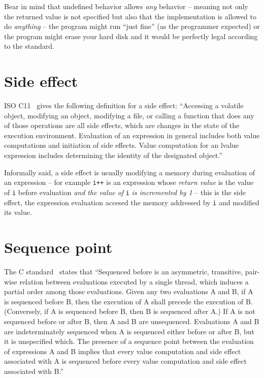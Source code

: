 Bear in mind that undefined behavior allows \emph{any} behavior -- meaning not only the returned value is not specified but also that the implementation is allowed to do \emph{anything} -- the program might run ``just fine'' (as the programmer expected) or the program might erase your hard disk and it would be perfectly legal according to the standard.

\section{Side effect}
ISO C11~\cite{WG14N1570} gives the following definition for a side effect: ``Accessing a volatile object, modifying an object, modifying a file, or calling a function that does any of those operations are all side effects, which are changes in the state of the execution environment. Evaluation of an expression in general includes both value computations and initiation of side effects. Value computation for an lvalue expression includes determining the identity of the designated object.''

Informally said, a side effect is usually modifying a memory during evaluation of an expression -- for example \verb|i++| is an expression whose \emph{return value} is the value of \verb|i| before evaluation \emph{and the value of }\verb|i|\emph{ is incremented by 1} -- this is the side effect, the expression evaluation accesed the memory addressed by \verb|i| and modified its value.

\section{Sequence point}
The C standard~\cite{WG14N1570} states that ``Sequenced before is an asymmetric, transitive, pair-wise relation between evaluations
executed by a single thread, which induces a partial order among those evaluations.
Given any two evaluations A and B, if A is sequenced before B, then the execution of A
shall precede the execution of B. (Conversely, if A is sequenced before B, then B is
sequenced after A.) If A is not sequenced before or after B, then A and B are
unsequenced. Evaluations A and B are indeterminately sequenced when A is sequenced
either before or after B, but it is unspecified which. The presence of a sequence point
 between the evaluation of expressions A and B implies that every value computation and
side effect associated with A is sequenced before every value computation and side effect
associated with B.''

